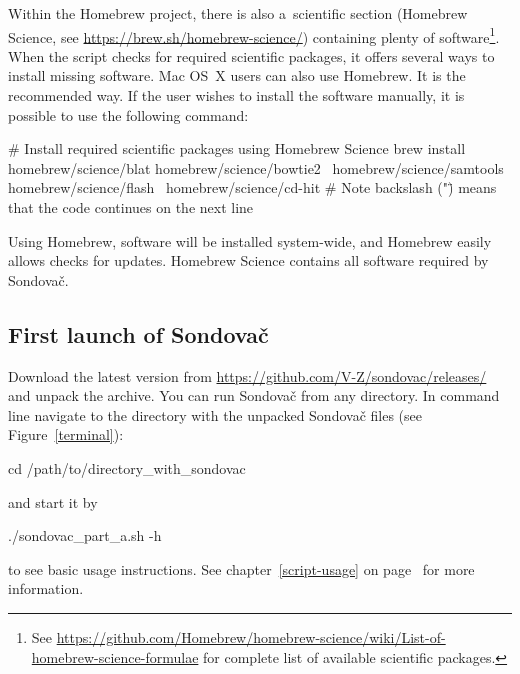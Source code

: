 \documentclass[a4paper, 11pt, twoside]{article}
\begin{document}
Within the Homebrew project, there is also a~scientific section (Homebrew Science, see \url{https://brew.sh/homebrew-science/}) containing plenty of software\footnote{See \url{https://github.com/Homebrew/homebrew-science/wiki/List-of-homebrew-science-formulae} for co\-mplete list of available scientific packages.}. When the script checks for required scientific packages, it offers several ways to install missing software. Mac OS~X users can also use Homebrew. It is the recommended way. If the user wishes to install the software manually, it is possible to use the following command:

\begin{bashcode}
  # Install required scientific packages using Homebrew Science
  brew install homebrew/science/blat homebrew/science/bowtie2 \
    homebrew/science/samtools homebrew/science/flash \
    homebrew/science/cd-hit
  # Note backslash ("\") means that the code continues on the next line
\end{bashcode}

Using Homebrew, software will be installed system-wide, and Homebrew easily allows checks for updates. Homebrew Science contains all software required by Sondovač.

\subsection{First launch of Sondovač}
\label{script-start}

Download the latest version from \url{https://github.com/V-Z/sondovac/releases/} and unpack the archive. You can run Sondovač from any directory. In command line navigate to the directory with the unpacked Sondovač files (see Figure~\ref{terminal}):

\begin{bashcode}
  cd /path/to/directory_with_sondovac
\end{bashcode}

and start it by

\begin{bashcode}
  ./sondovac_part_a.sh -h
\end{bashcode}

to see basic usage instructions. See chapter~\ref{script-usage} on page~\pageref{script-usage} for more information.
\end{document}
